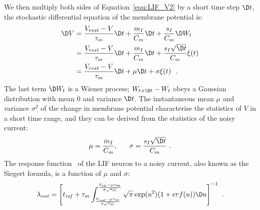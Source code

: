 	We then multiply both sides of Equation~\ref{equ:LIF_V2} by a short time step $\D t$, the stochastic differential equation of the membrane potential is: %
	\begin{equation}
	\begin{aligned}
	\D V&= \frac{V_{rest} - V}{\tau_m }\D t + \frac{m_I}{C_m} \D t + \frac{s_I}{C_m}  \D W_t \\
	&=\frac{V_{rest} - V}{\tau_m }\D t + \frac{m_I}{C_m} \D t + \frac{s_I \sqrt{\D t}}{C_m} \xi(t)  \\
	&=\frac{V_{rest} - V}{\tau_m }\D t + \mu \D t + \sigma \xi(t) ~~. 
	\end{aligned}
	\end{equation}	
	The last term $\D W_t$ is a Wiener process; $W_{t +\D t} - W_{t}$ obeys a Gaussian distribution with mean 0 and variance $\D t$.
	The instantaneous mean $\mu$ and variance $\sigma^2$ of the change in membrane potential characterise the statistics of $V$ in a short time range, and they can be derived from the statistics of the noisy current:
	\begin{equation}
	\mu =\dfrac{m_I}{C_m}, ~~~~~ \sigma = \dfrac{s_I \sqrt{\D t}}{C_m}~.
	\end{equation}
	The response function~\citep{rauch2003neocortical,la2008response} of the LIF neuron to a noisy current, also known as the Siegert formula, is a function of $\mu$ and $\sigma$:
	\begin{equation}
	\lambda_\mathit{out}=
	\left [ t_\mathit{ref}+\tau_m \int_{\frac{V_\mathit{rest}-\mu \tau_m }{\sigma \sqrt{\tau_m}}}^{\frac{V_{th}-\mu \tau_m }{\sigma \sqrt{\tau_m}}} \sqrt{\pi} \exp(u^{2}) (1+erf(u)) \D u \right ]^{-1} ~.
	\label{equ:siegert}
	\end{equation}


